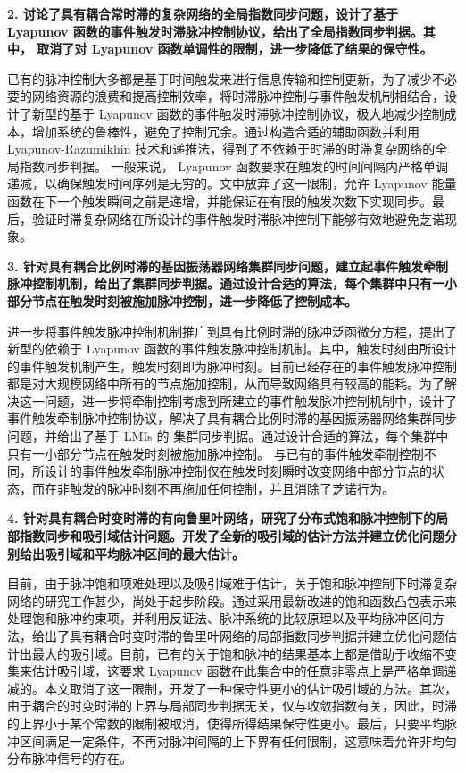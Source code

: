 \textbf{2. 讨论了具有耦合常时滞的复杂网络的全局指数同步问题，设计了基于 Lyapunov 函数的事件触发时滞脉冲控制协议，给出了全局指数同步判据。其中， 取消了对 Lyapunov 函数单调性的限制，进一步降低了结果的保守性。}

已有的脉冲控制大多都是基于时间触发来进行信息传输和控制更新，为了减少不必要的网络资源的浪费和提高控制效率，将时滞脉冲控制与事件触发机制相结合，设计了新型的基于 Lyapunov 函数的事件触发时滞脉冲控制协议，极大地减少控制成本，增加系统的鲁棒性，避免了控制冗余。通过构造合适的辅助函数并利用 Lyapunov-Razumikhin 技术和递推法，得到了不依赖于时滞的时滞复杂网络的全局指数同步判据。
一般来说， Lyapunov 函数要求在触发的时间间隔内严格单调递减，以确保触发时间序列是无穷的。文中放弃了这一限制，允许 Lyapunov 能量函数在下一个触发瞬间之前是递增，并能保证在有限的触发次数下实现同步。最后，验证时滞复杂网络在所设计的事件触发时滞脉冲控制下能够有效地避免芝诺现象。

 

\textbf{3.  针对具有耦合比例时滞的基因振荡器网络集群同步问题，建立起事件触发牵制脉冲控制机制，给出了集群同步判据。通过设计合适的算法，每个集群中只有一小部分节点在触发时刻被施加脉冲控制，进一步降低了控制成本。}

进一步将事件触发脉冲控制机制推广到具有比例时滞的脉冲泛函微分方程，提出了新型的依赖于 Lyapunov 函数的事件触发脉冲控制机制。其中，触发时刻由所设计的事件触发机制产生，触发时刻即为脉冲时刻。目前已经存在的事件触发脉冲控制都是对大规模网络中所有的节点施加控制，从而导致网络具有较高的能耗。为了解决这一问题，进一步将牵制控制考虑到所建立的事件触发脉冲控制机制中，设计了事件触发牵制脉冲控制协议，解决了具有耦合比例时滞的基因振荡器网络集群同步问题，并给出了基于 LMIs 的 集群同步判据。通过设计合适的算法，每个集群中只有一小部分节点在触发时刻被施加脉冲控制。 与已有的事件触发牵制控制不同，所设计的事件触发牵制脉冲控制仅在触发时刻瞬时改变网络中部分节点的状态，而在非触发的脉冲时刻不再施加任何控制，并且消除了芝诺行为。


\textbf{4. 针对具有耦合时变时滞的有向鲁里叶网络，研究了分布式饱和脉冲控制下的局部指数同步和吸引域估计问题。开发了全新的吸引域的估计方法并建立优化问题分别给出吸引域和平均脉冲区间的最大估计。}

目前，由于脉冲饱和项难处理以及吸引域难于估计，关于饱和脉冲控制下时滞复杂网络的研究工作甚少，尚处于起步阶段。通过采用最新改进的饱和函数凸包表示来处理饱和脉冲约束项，并利用反证法、脉冲系统的比较原理以及平均脉冲区间方法，给出了具有耦合时变时滞的鲁里叶网络的局部指数同步判据并建立优化问题估计出最大的吸引域。目前，已有的关于饱和脉冲的结果基本上都是借助于收缩不变集来估计吸引域，这要求 Lyapunov 函数在此集合中的任意非零点上是严格单调递减的。本文取消了这一限制，开发了一种保守性更小的估计吸引域的方法。其次，
由于耦合的时变时滞的上界与局部同步判据无关，仅与收敛指数有关，因此，时滞的上界小于某个常数的限制被取消，使得所得结果保守性更小。最后，只要平均脉冲区间满足一定条件，不再对脉冲间隔的上下界有任何限制，这意味着允许非均匀分布脉冲信号的存在。



